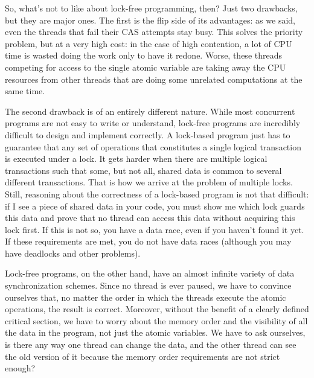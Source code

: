 So, what's not to like about lock-free programming, then? Just two drawbacks, but they are major ones. The first is the flip side of its advantages: as we said, even the threads that fail their CAS attempts stay busy. This solves the priority problem, but at a very high cost: in the case of high contention, a lot of CPU time is wasted doing the work only to have it redone. Worse, these threads competing for access to the single atomic variable are taking away the CPU resources from other threads that are doing some unrelated computations at the same time.

The second drawback is of an entirely different nature. While most concurrent programs are not easy to write or understand, lock-free programs are incredibly difficult to design and implement correctly. A lock-based program just has to guarantee that any set of operations that constitutes a single logical transaction is executed under a lock. It gets harder when there are multiple logical transactions such that some, but not all, shared data is common to several different transactions. That is how we arrive at the problem of multiple locks. Still, reasoning about the correctness of a lock-based program is not that difficult: if I see a piece of shared data in your code, you must show me which lock guards this data and prove that no thread can access this data without acquiring this lock first. If this is not so, you have a data race, even if you haven't found it yet. If these requirements are met, you do not have data races (although you may have deadlocks and other problems).

Lock-free programs, on the other hand, have an almost infinite variety of data synchronization schemes. Since no thread is ever paused, we have to convince ourselves that, no matter the order in which the threads execute the atomic operations, the result is correct. Moreover, without the benefit of a clearly defined critical section, we have to worry about the memory order and the visibility of all the data in the program, not just the atomic variables. We have to ask ourselves, is there any way one thread can change the data, and the other thread can see the old version of it because the memory order requirements are not strict enough?

